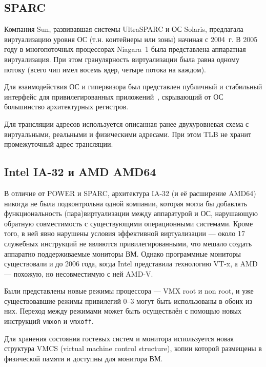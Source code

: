 \subsection{SPARC}

Компания Sun, развивавшая системы UltraSPARC и ОС Solaris, предлагала виртуализацию уровня ОС (т.н. контейнеры или зоны) начиная с 2004~г. В 2005 году в многопоточных процессорах Niagara~1 была представлена аппаратная виртуализация. При этом гранулярность виртуализации была равна одному потоку (всего чип имел восемь ядер, четыре потока на каждом). 

Для взаимодействия ОС и гипервизора был представлен публичный и стабильный интерфейс для привилегированных приложений~\cite{sun4v-spec}, скрывающий от ОС большинство архитектурных регистров.

Для трансляции адресов используется описанная ранее двухуровневая схема с виртуальными, реальными и физическими адресами. При этом TLB не хранит промежуточный адрес трансляции. 

\subsection{Intel IA-32 и AMD AMD64}

В отличие от POWER и SPARC, архитектура IA-32 (и её расширение AMD64) никогда не была подконтрольна одной компании, которая могла бы добавлять функциональность (пара)виртуализации между аппаратурой и ОС, нарушающую обратную совместимость с существующими операционными системами. Кроме того, в ней явно нарушены условия эффективной виртуализации --- около 17 служебных инструкций не являются привилегированными, что мешало создать аппаратно поддерживаемые мониторы ВМ. Однако программные мониторы существовали и до 2006 года, когда Intel представила технологию VT-x, а AMD --- похожую, но несовместимую с ней AMD-V. 

Были представлены новые режимы процессора --- VMX root и non root, и уже существовавшие режимы привилегий 0--3 могут быть использованы в обоих из них. Переход между режимами может быть осуществлён с помощью новых инструкций \texttt{vmxon} и \texttt{vmxoff}. 

Для хранения состояния гостевых систем и монитора используется новая структура VMCS (\abbr virtual machine control structure), копии которой размещены в физической памяти и доступны для монитора ВМ.

